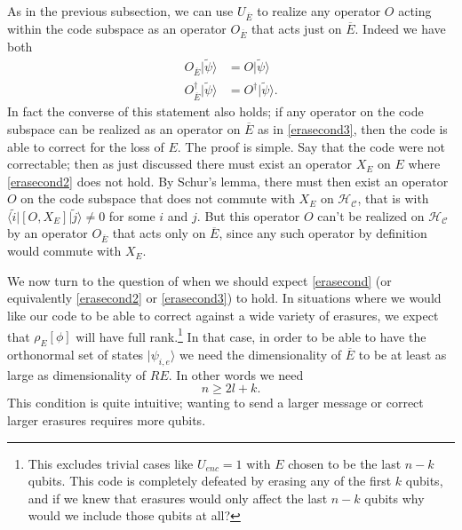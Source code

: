 \documentclass[11pt]{article}
\newcommand{\be}{\begin{equation}}
\newcommand{\ee}{\end{equation}}
\newcommand{\HC}{\mathcal{H}_{\mathcal{C}}}
\newcommand{\lan}{\langle}
\newcommand{\ran}{\rangle}
\newcommand{\wt}{\widetilde}
\begin{document}
As in the previous subsection, we can use $U_{\overline{E}}$ to realize any operator $O$ acting within the code subspace as an operator $O_{\overline{E}}$ that acts just on $\overline{E}$.  Indeed we have both
\begin{align}\nonumber
O_{\overline{E}}|\wt{\psi}\ran&=O|\wt{\psi}\ran\\
O_{\overline{E}}^\dagger|\wt{\psi}\ran&=O^\dagger|\wt{\psi}\ran.\label{erasecond3}
\end{align}
In fact the converse of this statement also holds; if any operator on the code subspace can be realized as an operator on $\overline{E}$ as in \eqref{erasecond3}, then the code is able to correct for the loss of $E$.  The proof is simple. Say that the code were not correctable; then as just discussed there must exist an operator $X_E$ on $E$ where \eqref{erasecond2} does not hold.  By Schur's lemma, there must then exist an operator $O$ on the code subspace that does not commute with $X_E$ on $\HC$, that is with $\lan\wt{i}|[O,X_E]|\wt{j}\ran\neq 0$ for some $i$ and $j$.  But this operator $O$ can't be realized on $\HC$ by an operator $O_{\overline{E}}$ that acts only on $\overline{E}$, since any such operator by definition would commute with $X_E$.  
 
We now turn to the question of when we should expect \eqref{erasecond} (or equivalently \eqref{erasecond2} or \eqref{erasecond3}) to hold.  In situations where we would like our code to be able to correct against a wide variety of erasures, we expect that $\rho_E[\phi]$ will have full rank.\footnote{This excludes trivial cases like $U_{enc}=1$ with $E$ chosen to be the last $n-k$ qubits.  This code is completely defeated by erasing any of the first $k$ qubits, and if we knew that erasures would only affect the last $n-k$ qubits why would we include those qubits at all?}  In that case, in order to be able to have the orthonormal set of states $|\psi_{i,e}\ran$ we need the dimensionality of $\overline{E}$ to be at least as large as dimensionality of $RE$.  In other words we need
\be\label{lcond}
n\geq2l+k.
\ee
This condition is quite intuitive; wanting to send a larger message or correct larger erasures requires more qubits.  
\end{document}
